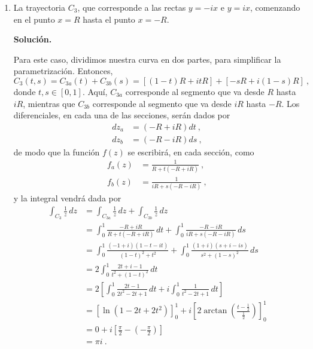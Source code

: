 \begin{ejemplo}
\begin{enumerate}[label=\alph*)]
        \item La trayectoria $C_3$, que corresponde a las rectas $y = -ix$ e $y = ix$, comenzando en el punto $x = R$ hasta el punto $x = -R$.
        
        \noindent \textbf{Solución.}

        Para este caso, dividimos nuestra curva en dos partes, para simplificar la parametrización. Entonces,
        \begin{equation*}
            C_3(t, s) = C_{3a}(t) + C_{3b}(s) = [(1-t)R + itR] + [-sR + i(1-s)R] \ ,
        \end{equation*}
        donde $t, s \in [0,1]$. Aquí, $C_{3a}$ corresponde al segmento que va desde $R$ hasta $iR$, mientras que $C_{3b}$ corresponde al segmento que va desde $iR$ hasta $-R$. Los diferenciales, en cada una de las secciones, serán dados por 
        \begin{align*}
            dz_a & = (-R + iR) dt \ , \\
            dz_b & = (-R - iR) ds \ ,
        \end{align*}
        de modo que la función $f(z)$ se escribirá, en cada sección, como 
        \begin{align*}
            f_a(z) & = \frac{1}{R+ t(-R+iR)} \ , \\
            f_b(z) & = \frac{1}{iR + s(-R-iR)} \ ,
        \end{align*}
        y la integral vendrá dada por 
        \begin{align*}
            \int_{C_3} \frac{1}{z} \, dz & = \int_{C_{3a}} \frac{1}{z} \, dz + \int_{C_{3b}} \frac{1}{z} \, dz \\
            & = \int_0^1 \frac{-R + iR}{R + t(-R+iR)} \, dt + \int_0^1 \frac{-R-iR}{iR + s(-R-iR)} \, ds \\
            & = \int_0^1 \frac{(-1+i)(1-t-it)}{(1-t)^2 + t^2} + \int_0^1 \frac{(1+i)(s+i-is)}{s^2 + (1-s)^2} \, ds \\
            & = 2\int_0^1 \frac{2t+i-1}{t^2 + (1-t)^2} \, dt \\
            & = 2 \left[\int_0^1 \frac{2t-1}{2t^2 - 2t + 1} \, dt + i \int_0^1 \frac{1}{t^2 - 2t + 1} \, dt \right] \\
            & = \left[ \ln(1-2t+2t^2) \right]_0^1 + i \left[2 \arctan\left( \frac{t-\frac{1}{2}}{\frac{1}{2}} \right) \right]_0^1 \\
            & = 0 + i\left[ \frac{\pi}{2} - \left( - \frac{\pi}{2} \right) \right] \\
            & = \pi i \ .
        \end{align*}
    \end{enumerate}
\end{ejemplo}

